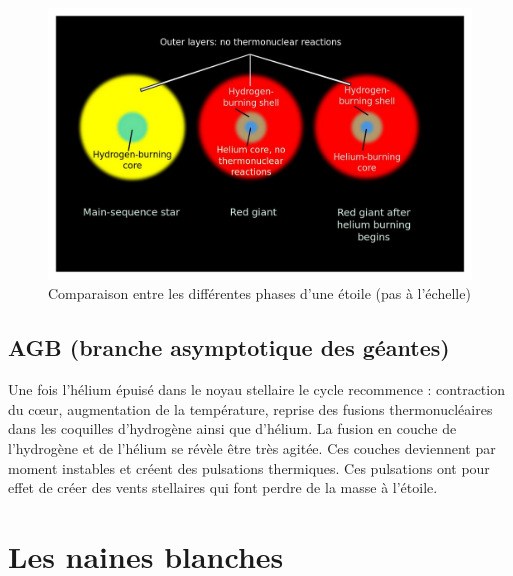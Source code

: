 \begin{figure}[H]\vspace{1cm}
	\centering
	\includegraphics[scale=0.3]{images/helium-flash}
	\caption{Comparaison entre les différentes phases d'une étoile (pas à l'échelle)}
\end{figure}\bigskip  

\subsection{AGB (branche asymptotique des géantes)}\medskip

Une fois l’hélium épuisé dans le noyau stellaire le cycle recommence : contraction du cœur, augmentation de la température, reprise des fusions thermonucléaires dans les coquilles d’hydrogène ainsi que d’hélium. La fusion en couche de l’hydrogène et de l’hélium se révèle être très agitée. Ces couches deviennent par moment instables et créent des pulsations thermiques. Ces pulsations ont pour effet de créer des vents stellaires qui font perdre de la masse à l’étoile.\bigskip

\section{Les naines blanches}\medskip

